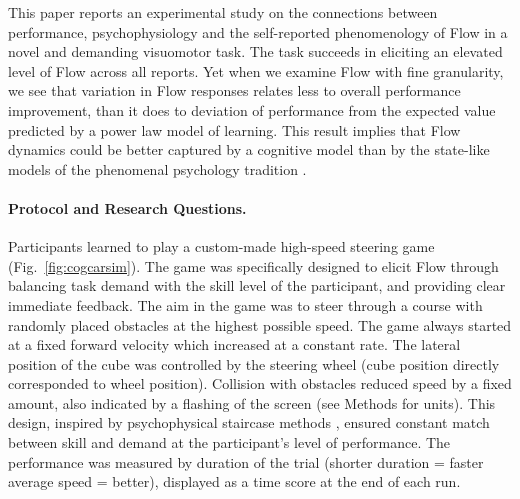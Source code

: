 \documentclass[fleqn,10pt]{wlscirep}
\begin{document}
This paper reports an experimental study on the connections between performance, psychophysiology and the self-reported phenomenology of Flow in a novel and demanding visuomotor task. The task succeeds in eliciting an elevated level of Flow across all reports. Yet when we examine Flow with fine granularity, we see that variation in Flow responses relates less to overall performance improvement, than it does to deviation of performance from the expected value predicted by a power law model of learning. This result implies that Flow dynamics could be better captured by a cognitive model than by the state-like models of the phenomenal psychology tradition \cite{Moneta2012}.


\paragraph{Protocol and Research Questions.}

Participants learned to play a custom-made high-speed steering game (Fig.~\ref{fig:cogcarsim}). The game was specifically designed to elicit Flow through balancing task demand with the skill level of the participant, and providing clear immediate feedback. The aim in the game was to steer through a course with randomly placed obstacles at the highest possible speed. The game always started at a fixed forward velocity which increased at a constant rate. The lateral position of the cube was controlled by the steering wheel (cube position directly corresponded to wheel position). Collision with obstacles reduced speed by a fixed amount, also indicated by a flashing of the screen (see Methods for units).
This design, inspired by psychophysical staircase methods \cite{Cornsweet1962}, ensured constant match between skill and demand at the participant's level of performance. The performance was measured by duration of the trial (shorter duration = faster average speed = better), displayed as a time score at the end of each run.
\end{document}
